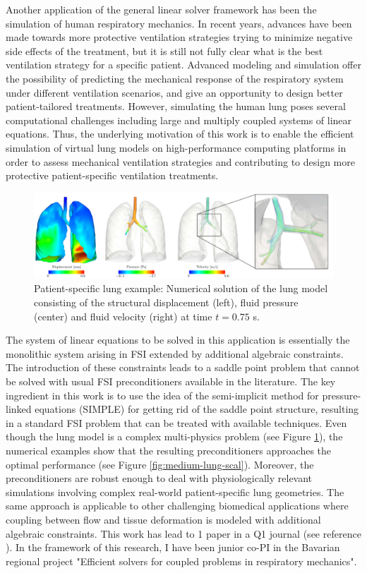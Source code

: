 \documentclass{article}
\newcommand{\bemph}[1]{#1}
\begin{document}
Another application of the general linear solver framework has been the simulation of human respiratory mechanics. In recent years, advances have been made towards more protective ventilation strategies \cite{tobin_2001} trying to minimize negative side effects of the treatment, but it is still not fully clear what is the best ventilation strategy for a specific patient. Advanced modeling and simulation offer the possibility of predicting the mechanical response of the respiratory system under different ventilation scenarios, and give an opportunity to design better patient-tailored treatments. However, simulating the human lung poses several computational challenges including large and multiply coupled systems of linear equations. Thus, the underlying motivation of this work is to enable the efficient simulation of virtual lung models on high-performance computing platforms in order to assess mechanical ventilation strategies and contributing to design more protective patient-specific ventilation treatments.

\begin{figure}[ht!]
\centering
\includegraphics[width=\textwidth]{../_assets/fig15.png}
\caption{Patient-specific lung example: Numerical solution of the lung model consisting of the structural displacement (left), fluid pressure (center) and fluid velocity (right) at time $t=0.75$ s.}
\label{fig:lung-sol}
\end{figure}

The system of linear equations to be solved  in this application is essentially the monolithic system arising in FSI extended by additional algebraic constraints. The introduction of these constraints leads to a saddle point problem that cannot be solved with usual FSI preconditioners available in the literature. The key ingredient in this work is to use the idea of the semi-implicit method for pressure-linked equations (SIMPLE) for getting rid of the saddle point structure, resulting in a standard FSI problem that can be treated with available techniques. Even though the lung model is a complex multi-physics problem (see Figure \ref{fig:lung-sol}), the numerical examples show that the resulting preconditioners approaches the optimal performance (see Figure \ref{fig:medium-lung-scal}). Moreover, the preconditioners are robust enough to deal with physiologically relevant simulations involving complex real-world patient-specific lung geometries. The same approach is applicable to other challenging biomedical applications where coupling between flow and tissue deformation is modeled with additional algebraic constraints. \bemph{This work has lead to 1 paper in a Q1 journal} (see reference \cite{verdugo_2016b}). In the framework of this research, \bemph{I have been junior co-PI in the Bavarian regional project "Efficient solvers for coupled problems in respiratory mechanics"}. 
\end{document}
